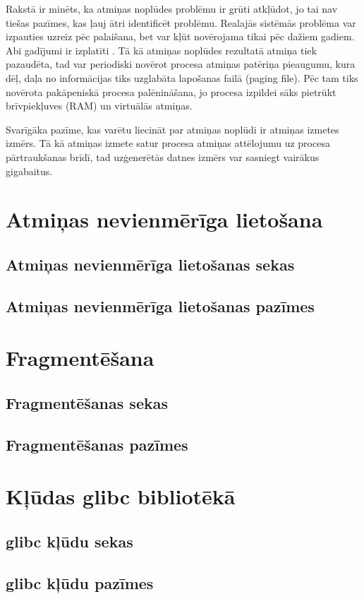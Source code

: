 Rakstā \cite{RHBJ} ir minēts, ka atmiņas noplūdes problēmu ir grūti atkļūdot, jo tai nav tiešas pazīmes, kas ļauj ātri identificēt problēmu.
Realajās sistēmās problēma var izpauties uzreiz pēc palaišana, bet var kļūt novērojama tikai pēc dažiem gadiem. Abi gadījumi ir izplatīti \cite{HTTM}.
Tā kā atmiņas noplūdes rezultatā atmiņa tiek pazaudēta, tad var periodiski novērot procesa atmiņas patēriņa pieaugumu, kura dēļ, daļa no informācijas tiks uzglabāta lapošanas failā (paging file).
Pēc tam tiks novērota pakāpeniskā procesa palēnināšana, jo procesa izpildei sāks pietrūkt brīvpiekļuves (RAM) un virtuālās atmiņas.

Svarīgāka pazīme, kas varētu liecināt par atmiņas noplūdi ir atmiņas izmetes izmērs.
Tā kā atmiņas izmete satur procesa atmiņas attēlojumu uz procesa pārtraukšanas brīdī, tad uzģenerētās datnes izmērs var sasniegt vairākus gigabaitus.




\section{Atmiņas nevienmērīga lietošana}
\subsection{Atmiņas nevienmērīga lietošanas sekas}
\subsection{Atmiņas nevienmērīga lietošanas pazīmes}

\section{Fragmentēšana}
\subsection{Fragmentēšanas sekas}
\subsection{Fragmentēšanas pazīmes}

\section{Kļūdas glibc bibliotēkā}
\subsection{glibc kļūdu sekas}
\subsection{glibc kļūdu pazīmes}
